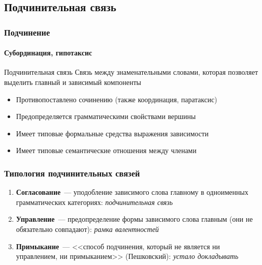 \subsection{Подчинительная связь}

\begin{frame}
  \frametitle{Подчинение}
  \framesubtitle{Субординация, гипотаксис}

  \begin{alertblock}{Подчинительная связь}
    Связь между знаменательными словами, которая позволяет выделить главный и зависимый компоненты
  \end{alertblock}

  \vfill

  \begin{itemize}
    \item Противопоставлено сочинению (также координация, паратаксис)
    \item Предопределяется грамматическими свойствами вершины
    \item Имеет типовые формальные средства выражения зависимости
    \item Имеет типовые семантические отношения между членами
  \end{itemize}
\end{frame}

\begin{frame}
  \frametitle{Типология подчинительных связей}

  \begin{enumerate}
    \item \textbf{Согласование}~--- уподобление зависимого слова главному в одноименных грамматических категориях: \textit{подчинительная связь}
    \item \textbf{Управление}~--- предопределение формы зависимого слова главным (они не обязательно совпадают): \textit{рамка валентностей}
    \item \textbf{Примыкание}~--- <<способ подчинения, который не является ни управлением, ни примыканием>> (Пешковский): \textit{устало докладывать}
  \end{enumerate}
\end{frame}

